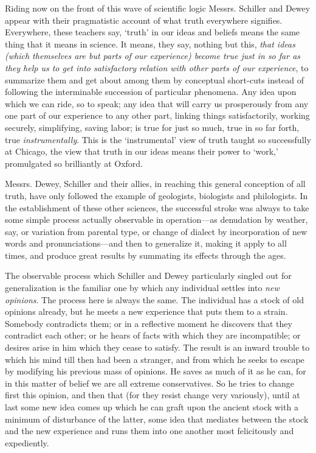 Riding now on the front of this wave of scientific logic Messrs.
Schiller and Dewey appear  with their pragmatistic account of
what truth everywhere signifies. Everywhere, these teachers say,
`truth' in our ideas and beliefs means the same thing that it means in
science. It means, they say, nothing but this, \textit{that ideas
(which themselves are but parts of our experience) become true just in
so far as they help us to get into satisfactory relation with other
parts of our experience}, to summarize them and get about among them
by conceptual short-cuts instead of following the interminable
succession of particular phenomena. Any idea upon which we can ride,
so to speak; any idea that will carry us prosperously from any one
part of our experience to any other part, linking things
satisfactorily, working securely, simplifying, saving labor; is true
for just so much, true in so far forth, true \textit{instrumentally}.
This is the `instrumental' view of truth taught so successfully at
Chicago, the view that truth in our ideas means their power to `work,'
promulgated so brilliantly at Oxford.

Messrs. Dewey, Schiller and their allies, in reaching this general
conception of all truth,  have only followed the example of
geologists, biologists and philologists. In the establishment of these
other sciences, the successful stroke was always to take some simple
process actually observable in op\-er\-a\-tion---as denudation by
weather, say, or variation from parental type, or change of dialect
by incorporation of new words and pro\-nun\-ci\-a\-tions---and then to
generalize it, making it apply to all times, and produce great results
by summating its effects through the ages.

The observable process which Schiller and Dewey particularly singled
out for generalization is the familiar one by which any individual
settles into \textit{new opinions}. The process here is always the
same. The individual has a stock of old opinions already, but he meets
a new experience that puts them to a strain. Somebody contradicts
them; or in a reflective moment he discovers that they contradict
each other; or he hears of facts with which they are incompatible; or
desires arise in him which they cease to satisfy. The result is an
inward trouble to which his mind till then had been a stranger,
 and from which he seeks to escape by modifying his previous
mass of opinions. He saves as much of it as he can, for in this matter
of belief we are all extreme conservatives. So he tries to change
first this opinion, and then that (for they resist change very
variously), until at last some new idea comes up which he can graft
upon the ancient stock with a minimum of disturbance of the latter,
some idea that mediates between the stock and the new experience and
runs them into one another most felicitously and expediently.

